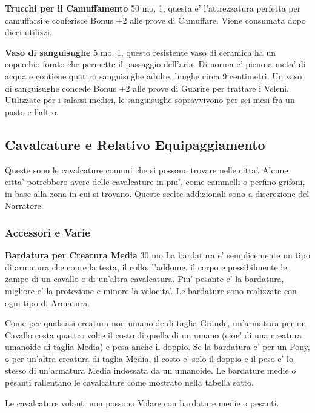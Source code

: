 \documentclass[a4paper,11pt,twoside,openany]{book}
\begin{document}
{\textbf{Trucchi per il Camuffamento} 50 mo, 1, questa e' l'attrezzatura perfetta per camuffarsi e conferisce Bonus +2 alle prove di Camuffare. Viene consumata dopo dieci utilizzi.

\textbf{Vaso di sanguisughe} 5 mo, 1, questo resistente vaso di ceramica ha un coperchio forato che permette il passaggio dell'aria. Di norma e' pieno a meta' di acqua e contiene quattro sanguisughe adulte, lunghe circa 9 centimetri.
Un vaso di sanguisughe concede Bonus +2 alle prove di Guarire per trattare i Veleni. Utilizzate per i salassi medici, le sanguisughe sopravvivono per sei mesi fra un pasto e l'altro.

\pagebreak

\subsection{Cavalcature e Relativo Equipaggiamento}

\label{cavalcature-e-relativo-equipaggiamento}

Queste sono le cavalcature comuni che si possono trovare nelle citta'. Alcune citta' potrebbero avere delle cavalcature in piu', come cammelli o perfino grifoni, in base alla zona in cui si trovano. Queste scelte addizionali sono a discrezione del Narratore.

\subsubsection{Accessori e Varie}

\label{accessori-e-varie}

\textbf{Bardatura per Creatura Media} 30 mo La bardatura e' semplicemente un tipo di armatura che copre la testa, il collo, l'addome, il corpo e possibilmente le zampe di un cavallo o di un'altra cavalcatura. Piu' pesante e' la bardatura, migliore e' la protezione e minore la velocita'. Le bardature sono realizzate con ogni tipo di Armatura.

Come per qualsiasi creatura non umanoide di taglia Grande, un'armatura per un Cavallo costa quattro volte il costo di quella di un umano (cioe' di una creatura umanoide di taglia Media) e pesa anche il doppio. Se la bardatura e' per un Pony, o per un'altra creatura di taglia Media, il costo e' solo il doppio e il peso e' lo stesso di un'armatura Media indossata da un umanoide. Le bardature medie o pesanti rallentano le cavalcature come mostrato nella tabella sotto.

Le cavalcature volanti non possono Volare con bardature medie o pesanti.

}
\end{document}

